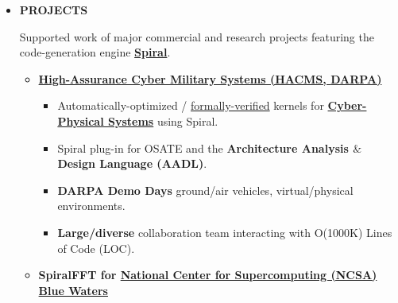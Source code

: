 \documentclass{article}
\begin{document}
    \begin{itemize}

      \item \textbf{PROJECTS}

      Supported work of major commercial and research projects featuring the code-generation engine \textbf{\href{http://spiral.net/}{Spiral}}.


      \begin{itemize}
        \item \textbf{\href{http://www.darpa.mil/Our_Work/I2O/Programs/High-Assurance_Cyber_Military_Systems_(HACMS).aspx}{High-Assurance Cyber Military Systems (HACMS, \href{http://www.darpa.mil/default.aspx}{DARPA})}}

        \begin{itemize}

          \item Automatically-optimized / \href{https://en.wikipedia.org/wiki/Formal_methods}{formally-verified} kernels for \textbf{\href{https://en.wikipedia.org/wiki/Cyber-physical_system}{Cyber-Physical Systems}} using Spiral. 

          \item Spiral plug-in for OSATE and the \textbf{Architecture Analysis $\&$ Design Language (AADL)}.

          \item \textbf{DARPA Demo Days} ground/air vehicles, virtual/physical environments.  


          \item \textbf{Large/diverse} collaboration team interacting with O(1000K) Lines of Code (LOC). 
        \end{itemize}

      \item \textbf{SpiralFFT for \href{http://www.ncsa.illinois.edu}{National Center for Supercomputing  (NCSA)} \href{http://www.ncsa.illinois.edu/enabling/bluewaters}{Blue Waters}}

        \begin{itemize}


\end{itemize}
\end{itemize}
\end{itemize}
\end{document}
